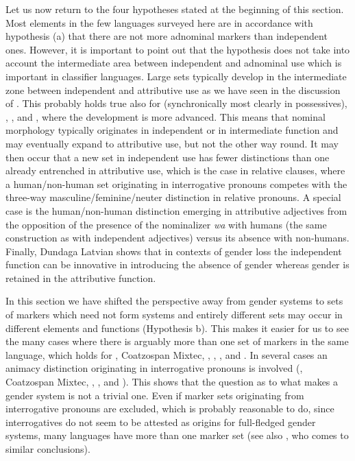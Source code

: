 \documentclass[output=collectionpaper]{langsci/langscibook}
\begin{document}
Let us now return to the four hypotheses stated at the beginning of this section. Most elements in the few languages surveyed here are in accordance with hypothesis (a) that there are not more adnominal markers than independent ones. However, it is important to point out that the hypothesis does not take into account the intermediate area between independent and adnominal use which is important in classifier languages. Large sets typically develop in the intermediate zone between independent and attributive use as we have seen in the discussion of . This probably holds true also for  (synchronically most clearly in possessives), , , and , where the development is more advanced. This means that nominal morphology typically originates in independent or in intermediate function and may eventually expand to attributive use, but not the other way round. It may then occur that a new set in independent use has fewer distinctions than one already entrenched in attributive use, which is the case in  relative clauses, where a human/non-human set originating in interrogative pronouns competes with the three-way masculine/feminine/neuter distinction in relative pronouns. A special case is the  human/non-human distinction emerging in attributive adjectives from the opposition of the presence of the nominalizer \textit{wa} with humans (the same construction as with independent adjectives) versus its absence with non-humans. Finally, Dundaga Latvian shows that in contexts of gender loss the independent function can be innovative in introducing the absence of gender whereas gender is retained in the attributive function.

In this section we have shifted the perspective away from gender systems to sets of markers which need not form systems and entirely different sets may occur in different elements and functions (Hypothesis b). This makes it easier for us to see the many cases where there is arguably more than one set of markers in the same language, which holds for , Coatzospan Mixtec, , , , and . In several cases an animacy distinction originating in interrogative pronouns is involved (, Coatzospan Mixtec, , , and ). This shows that the question as to what makes a gender system is not a trivial one. Even if marker sets originating from interrogative pronouns are excluded, which is probably reasonable to do, since interrogatives do not seem to be attested as origins for full-fledged gender systems, many languages have more than one marker set (see also \citealt{Dahl2000b}, who comes to similar conclusions).
\end{document}

